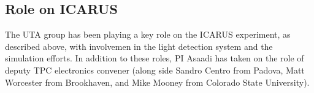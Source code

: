 

\subsection*{Role on ICARUS}
The UTA group has been playing a key role on the ICARUS experiment, as described above, with involvemen in the light detection system and the simulation efforts. In addition to these roles, PI Asaadi has taken on the role of deputy TPC electronics convener (along side Sandro Centro from Padova, Matt Worcester from Brookhaven, and Mike Mooney from Colorado State University). 

